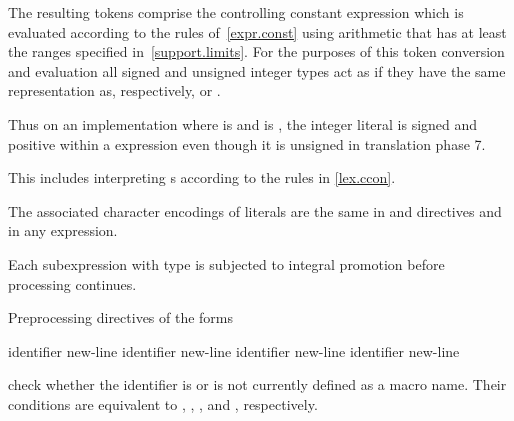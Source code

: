 \pnum
The resulting tokens comprise the controlling constant expression
which is evaluated according to the rules of~\ref{expr.const}
using arithmetic that has at least the ranges specified
in~\ref{support.limits}. For the purposes of this token conversion and evaluation
all signed and unsigned integer types
act as if they have the same representation as, respectively,
 or .
\begin{note}
Thus on an
implementation where  is 
and  is ,
the integer literal  is signed and positive within a 
expression even though it is unsigned in translation phase
7.
\end{note}
This includes interpreting s
according to the rules in \ref{lex.ccon}.
\begin{note}
The associated character encodings of literals are the same
in  and  directives and in any expression.
\end{note}
Each subexpression with type
is subjected to integral promotion before processing continues.

\pnum
Preprocessing directives of the forms
\begin{ncsimplebnf}\obeyspaces
{} identifier new-line \br
{}%
 identifier new-line \br
{}%
 identifier new-line \br
{}%
 identifier new-line 
%
\end{ncsimplebnf}
check whether the identifier is or is not currently defined as a macro name.
Their conditions are equivalent to
  ,
  ,
  , and
  ,
respectively.

